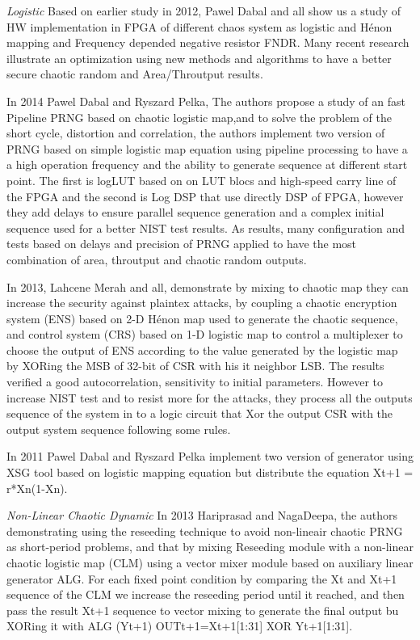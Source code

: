 \textit{Logistic} Based on earlier study in 2012, Pawel Dabal and all show us a study of HW implementation in FPGA of different chaos system as logistic and Hénon mapping and Frequency depended negative resistor FNDR. Many recent research illustrate an optimization using new methods and algorithms to have a better secure chaotic random and Area/Throutput results.

In 2014 Pawel Dabal and Ryszard Pelka, The authors propose a study of an fast Pipeline PRNG based on chaotic logistic map,and to solve the problem of the short cycle, distortion and correlation, the authors implement two version of PRNG based on simple logistic map equation using pipeline processing to have a a high operation frequency and the ability to generate sequence at different start point. The first is logLUT based on on LUT blocs and high-speed carry line of the FPGA and the second is Log DSP that use directly DSP of FPGA, however they add delays to ensure parallel sequence generation and a complex initial sequence used for a better NIST test results. As results, many configuration and tests based on delays and precision of PRNG applied to have the most combination of area, throutput and chaotic random outputs. 

In 2013, Lahcene Merah and all, demonstrate by mixing to chaotic map they can increase the security against plaintex attacks, by coupling a chaotic encryption system (ENS) based on 2-D Hénon map used to generate the chaotic sequence, and control system (CRS) based on 1-D logistic map to control a multiplexer to choose the output of ENS according to the value generated by the logistic map by XORing the MSB of 32-bit of CSR with his it neighbor LSB. The results verified a good autocorrelation, sensitivity to initial parameters. However to increase NIST test and to resist more for the attacks, they process all the outputs sequence of the system in to a logic circuit that Xor the output CSR with the output system sequence following some rules.

In 2011 Pawel Dabal and Ryszard Pelka implement two version of generator using XSG tool based on logistic mapping equation but distribute the equation Xt+1 = r*Xn(1-Xn).

\textit{Non-Linear Chaotic Dynamic} In 2013 Hariprasad and NagaDeepa, the authors demonstrating using the reseeding technique to avoid non-lineair chaotic PRNG as short-period problems, and that by mixing Reseeding module with a non-linear chaotic logistic map (CLM) using a vector mixer module based on auxiliary linear generator ALG. For each fixed point condition by comparing the Xt and Xt+1 sequence of the CLM we increase the reseeding period until it reached, and then pass the result Xt+1 sequence to vector mixing to generate the final output bu XORing it with ALG (Yt+1) OUTt+1=Xt+1[1:31] XOR Yt+1[1:31].

